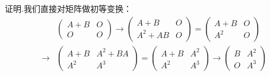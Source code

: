 \documentclass{article}
\begin{document}
\setcounter{page}{87}                           %
{\heiti 证明.}我们直接对矩阵做初等变换：
\begin{equation*}                               %
    \begin{split}                               %
        &\left(                                 %
        \begin{array}{cc}                       %
            A + B & O \\                        %
            O     & O %
        \end{array}
        \right)
        \longrightarrow                         %
        \left(
        \begin{array}{cc}
            A + B    & O \\
            A^2 + AB & O
        \end{array}
        \right)
        =
        \left(
        \begin{array}{cc}
            A + B & O \\
            A^2   & O
        \end{array}
        \right) \\
        \longrightarrow
        &\left(
        \begin{array}{cc}
            A + B & A^2 + BA \\
            A^2   & A^3
        \end{array}
        \right)
        =
        \left(
        \begin{array}{cc}
            A + B & A^2 \\
            A^2   & A^3
        \end{array}
        \right)
        \longrightarrow
        \left(
        \begin{array}{cc}
            B & A^2 \\
            O & A^3
        \end{array}
        \right)
    \end{split}
\end{equation*}
\end{document}
